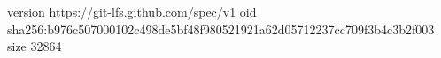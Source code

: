 version https://git-lfs.github.com/spec/v1
oid sha256:b976c507000102c498de5bf48f980521921a62d05712237cc709f3b4c3b2f003
size 32864
